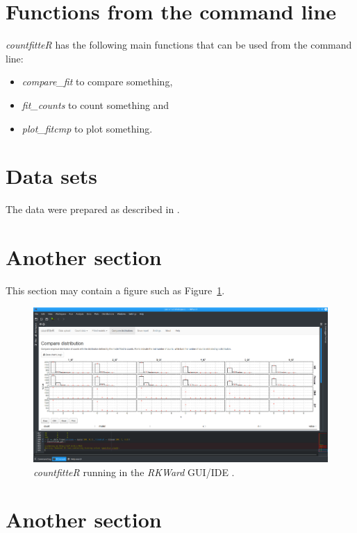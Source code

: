 \section{Functions from the command line}

\emph{countfitteR} has the following main functions that can
be used from the command line:

\begin{itemize}
    \item \textit{compare\_fit} to compare something,
    \item \textit{fit\_counts} to count something and
    \item \textit{plot\_fitcmp} to plot something.
\end{itemize}


\section{Data sets}

The data were prepared as described in \citep{rodiger_quantification_2018}.

\section{Another section}

This section may contain a figure such as Figure~\ref{figure:rlogo}.

\begin{figure}[htbp]
  \centering
  \includegraphics[width=0.99\columnwidth]{fig_gui}
  \caption{\emph{countfitteR} running in the \emph{RKWard} GUI/IDE \citep{rodiger_rkward:_2012}.}
  \label{figure:rlogo}
\end{figure}

\section{Another section}

